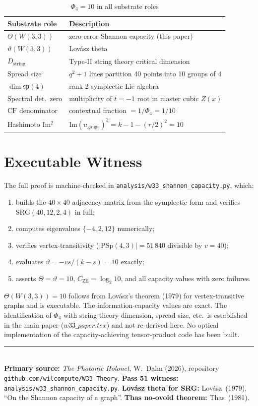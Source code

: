 \documentclass[11pt]{article}
\begin{document}
\begin{table}[h]
\centering
\caption{$\Phi_4 = 10$ in all substrate roles}
\begin{tabular}{ll}
\toprule
Substrate role & Description \\
\midrule
$\Theta(W(3,3))$ & zero-error Shannon capacity (this paper) \\
$\vartheta(W(3,3))$ & Lov\'asz theta \\
$D_{\mathrm{string}}$ & Type-II string theory critical dimension \\
Spread size & $q^2+1$ lines partition 40 points into 10 groups of 4 \\
$\dim\mathfrak{sp}(4)$ & rank-2 symplectic Lie algebra \\
Spectral det.\ zero & multiplicity of $t=-1$ root in master cubic $Z(x)$ \\
$\mathrm{CF}$ denominator & contextual fraction $= 1/\Phi_4 = 1/10$ \\
Hashimoto Im$^2$ & $\mathrm{Im}(u_{\mathrm{gauge}})^2 = k-1-(r/2)^2 = 10$ \\
\bottomrule
\end{tabular}
\end{table}

\section{Executable Witness}

The full proof is machine-checked in
\texttt{analysis/w33\_shannon\_capacity.py}, which:
\begin{enumerate}[nosep]
\item builds the $40\times 40$ adjacency matrix from the symplectic form
  and verifies $\mathrm{SRG}(40,12,2,4)$ in full;
\item computes eigenvalues $\{-4, 2, 12\}$ numerically;
\item verifies vertex-transitivity ($|\mathrm{PSp}(4,3)| = 51\,840$ divisible by $v=40$);
\item evaluates $\vartheta = -vs/(k-s) = 10$ exactly;
\item asserts $\Theta = \vartheta = 10$, $C_{\mathrm{ZE}} = \log_2 10$, and all
  capacity values with zero failures.
\end{enumerate}

\begin{honestbox}
$\Theta(W(3,3)) = 10$ follows from Lov\'asz's theorem (1979) for vertex-transitive
graphs and is executable. The information-capacity values are exact.
The identification of $\Phi_4$ with string-theory dimension, spread size, etc.\
is established in the main paper ($w33\_paper.tex$) and not re-derived here.
No optical implementation of the capacity-achieving tensor-product code has been built.
\end{honestbox}

\bigskip
\noindent\rule{\linewidth}{0.4pt}\\[0.3em]
{\footnotesize
\textbf{Primary source:} \emph{The Photonic Holonet}, W.~Dahn (2026), repository
\texttt{github.com/wilcompute/W33-Theory}.
\textbf{Pass 51 witness:} \texttt{analysis/w33\_shannon\_capacity.py}.
\textbf{Lov\'asz theta for SRG:} Lov\'asz~(1979), ``On the Shannon capacity of a graph''.
\textbf{Thas no-ovoid theorem:} Thas~(1981).
}
\end{document}
